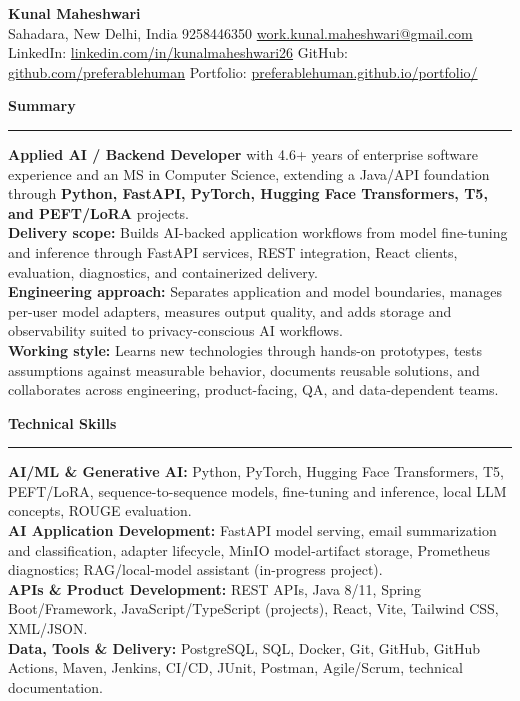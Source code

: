 \documentclass[11pt,letterpaper]{article}
\newcommand{\ressection}[1]{\Needspace{6\baselineskip}\vspace{8pt}\par\textbf{#1}\par\vspace{2pt}\hrule\vspace{5pt}}
\begin{document}
\pagestyle{empty}\raggedright\fontsize{11}{12.5}\selectfont

{\Large \textbf{Kunal Maheshwari}}\\
Sahadara, New Delhi, India \textbar{} 9258446350 \textbar{} \href{mailto:work.kunal.maheshwari@gmail.com}{work.kunal.maheshwari@gmail.com}\\
LinkedIn: \href{https://www.linkedin.com/in/kunalmaheshwari26}{linkedin.com/in/kunalmaheshwari26} \textbar{} GitHub: \href{https://github.com/preferablehuman}{github.com/preferablehuman} \textbar{} Portfolio: \href{https://preferablehuman.github.io/portfolio/}{preferablehuman.github.io/portfolio/}

\ressection{Summary}
\textbf{Applied AI / Backend Developer} with 4.6+ years of enterprise software experience and an MS in Computer Science, extending a Java/API foundation through \textbf{Python, FastAPI, PyTorch, Hugging Face Transformers, T5, and PEFT/LoRA} projects.\\[2pt]
\textbf{Delivery scope:} Builds AI-backed application workflows from model fine-tuning and inference through FastAPI services, REST integration, React clients, evaluation, diagnostics, and containerized delivery.\\[2pt]
\textbf{Engineering approach:} Separates application and model boundaries, manages per-user model adapters, measures output quality, and adds storage and observability suited to privacy-conscious AI workflows.\\[2pt]
\textbf{Working style:} Learns new technologies through hands-on prototypes, tests assumptions against measurable behavior, documents reusable solutions, and collaborates across engineering, product-facing, QA, and data-dependent teams.

\ressection{Technical Skills}
\textbf{AI/ML \& Generative AI:} Python, PyTorch, Hugging Face Transformers, T5, PEFT/LoRA, sequence-to-sequence models, fine-tuning and inference, local LLM concepts, ROUGE evaluation.\\
\textbf{AI Application Development:} FastAPI model serving, email summarization and classification, adapter lifecycle, MinIO model-artifact storage, Prometheus diagnostics; RAG/local-model assistant (in-progress project).\\
\textbf{APIs \& Product Development:} REST APIs, Java 8/11, Spring Boot/Framework, JavaScript/TypeScript (projects), React, Vite, Tailwind CSS, XML/JSON.\\
\textbf{Data, Tools \& Delivery:} PostgreSQL, SQL, Docker, Git, GitHub, GitHub Actions, Maven, Jenkins, CI/CD, JUnit, Postman, Agile/Scrum, technical documentation.
\end{document}
